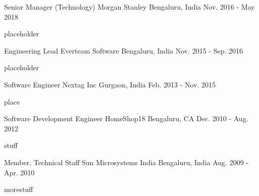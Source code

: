 
\begin{cventries}
  \cventry
    {Senior Manager (Technology)} %
    {Morgan Stanley} %
    {Bengaluru, India} %
    {Nov. 2016 - May 2018} %
    {
      \begin{cvitems} %
        \item {placeholder}
      \end{cvitems}
    }

  \cventry
    {Engineering Lead} %
    {Everteam Software} %
    {Bengaluru, India} %
    {Nov. 2015 - Sep. 2016} %
    {
      \begin{cvitems} %
        \item {placeholder}
      \end{cvitems}
    }

  \cventry
    {Software Engineer} %
    {Nextag Inc} %
    {Gurgaon, India} %
    {Feb. 2013 - Nov. 2015} %
    {
      \begin{cvitems} %
        \item {place}
      \end{cvitems}
    }

  \cventry
    {Software Development Engineer} %
    {HomeShop18} %
    {Bengaluru, CA} %
    {Dec. 2010 - Aug. 2012} %
    {
      \begin{cvitems} %
        \item {stuff}
      \end{cvitems}
    }

  \cventry
    {Member, Technical Staff} %
    {Sun Microsystems India} %
    {Bengaluru, India} %
    {Aug. 2009 - Apr. 2010} %
    {
      \begin{cvitems} %
        \item {morestuff}
      \end{cvitems}
    }
    
\end{cventries}

